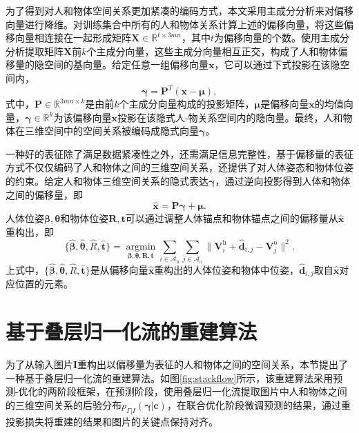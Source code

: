 为了得到对人和物体空间关系更加紧凑的编码方式，本文采用主成分分析来对偏移向量进行降维。对训练集合中所有的人和物体关系计算上述的偏移向量，将这些偏移向量相连接在一起形成矩阵$\mathbf{X}\in \mathbb{R}^{t\times 3mn}$，其中$t$为偏移向量的个数。使用主成分分析提取矩阵$\mathbf{X}$前$k$个主成分向量，这些主成分向量相互正交，构成了人和物体偏移量的隐空间的基向量。给定任意一组偏移向量$\mathbf{x}$，它可以通过下式投影在该隐空间内，
\begin{equation}
	\mathbf{\gamma} = \mathbf{P}^T(\mathbf{x} - \mathbf{\mu}),
\end{equation}
式中，$\mathbf{P}\in \mathbb{R}^{3mn\times k}$是由前$k$个主成分向量构成的投影矩阵，$\mathbf{\mu}$是偏移向量$\mathbf{x}$的均值向量，$\mathbf{\gamma} \in \mathbb{R}^{k}$为该偏移向量$\mathbf{x}$投影在该隐式人-物关系空间内的隐向量。最终，人和物体在三维空间中的空间关系被编码成隐式向量$\mathbf{\gamma}$。

一种好的表征除了满足数据紧凑性之外，还需满足信息完整性，基于偏移量的表征方式不仅仅编码了人和物体之间的三维空间关系，还提供了对人体姿态和物体位姿的约束。给定人和物体三维空间关系的隐式表达$\mathbf{\gamma}$，通过逆向投影得到人体和物体之间的偏移量，即
\begin{equation}\label{eq:reproject-offset}
	\hat{\mathbf{x}} = \mathbf{P}\mathbf{\gamma} + \mathbf{\mu}.
\end{equation}
人体位姿$\mathbf{\beta},\mathbf{\theta}$和物体位姿$\mathbf{R},\mathbf{t}$可以通过调整人体锚点和物体锚点之间的偏移量从$\hat{\mathbf{x}}$重构出，即
\begin{equation}\label{eq:recon_from_offset}
	\{\hat{\mathbf{\beta}}, \hat{\mathbf{\theta}}, \hat{R}, \hat{\mathbf{t}} \} = \mathop{\arg\min}\limits_{\mathbf{\beta}, \mathbf{\theta}, \mathbf{R}, \mathbf{t}} \sum_{i \in \mathcal{A}_{\text{h}}} \sum_{j \in \mathcal{A}_{\text{o}}} \| \mathbf{V}_i^{\text{h}} + \hat{\mathbf{d}}_{i,j} - \mathbf{V}_j^\text{o} \|^2.
\end{equation}
上式中，$\{\hat{\mathbf{\beta}}, \hat{\mathbf{\theta}}, \hat{R}, \hat{\mathbf{t}}\}$是从偏移向量$\hat{\mathbf{x}}$重构出的人体位姿和物体中位姿，$\hat{\mathbf{d}}_{i,j}$取自$\hat{\mathbf{x}}$对应位置的元素。

\section{基于叠层归一化流的重建算法}\label{sec:stackflow}
为了从输入图片$\mathbf{I}$重构出以偏移量为表征的人和物体之间的空间关系，本节提出了一种基于叠层归一化流的重建算法。如图\ref{fig:stackflow}所示，该重建算法采用预测-优化的两阶段框架，在预测阶段，使用叠层归一化流提取图片中人和物体之间的三维空间关系的后验分布$p_{\Gamma|I}(\mathbf{\gamma}|\mathbf{c})$，在联合优化阶段微调预测的结果，通过重投影损失将重建的结果和图片的关键点保持对齐。

